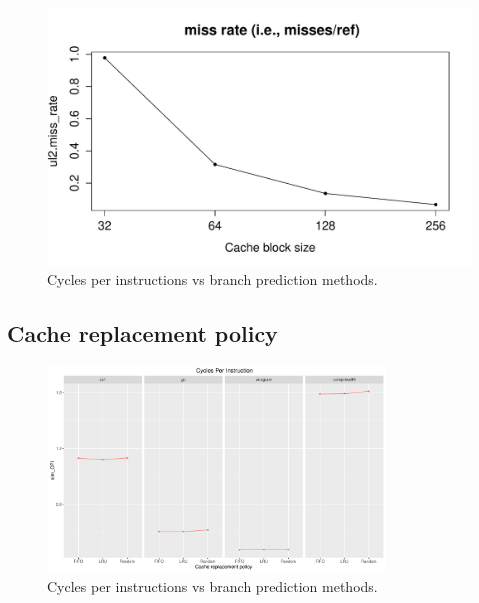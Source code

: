 \documentclass[10pt]{scrartcl}
\begin{document}
\begin{figure}[!htb]
\endminipage
{}%
  \includegraphics[trim={1cm 1.2cm 0 1.8cm},clip,width=\linewidth]{NewPlots/plot_BS_G_miss-rate}
\endminipage
\caption{Cycles per instructions vs branch prediction methods.}\label{fig:cache-bs_miss_rate}
\end{figure}

\FloatBarrier

\subsection{Cache replacement policy}

\begin{figure}[h]
  \centering
  \includegraphics[width=0.8\textwidth]{Plots/plot_CacheRP_sim_CPI}
  \caption{Cycles per instructions vs branch prediction methods.}\label{fig:cache-rp_sim_cpi}
\end{figure}
\end{document}
